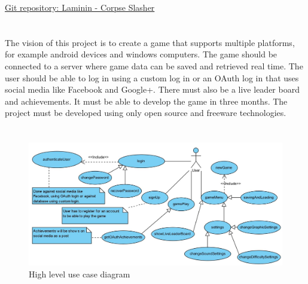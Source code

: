 \documentclass[letterpaper]{article}
\begin{document}
		\renewcommand{\cftdot}{}
		\hypersetup{linktocpage}
		\tableofcontents
		
		\begin{flushleft}
			\LARGE\href{https://github.com/njTaljaard/Laminin_CorpseSlasher/}{Git repository: Laminin - Corpse Slasher}
		\end{flushleft}
		
		\newpage
		
		\section*{\colorbox{blue}{}} 
		\vspace{0.2in}
		
		The vision of this project is to create a game that supports multiple platforms, for example android devices and windows computers. The game should be connected to a server where game data can be saved and retrieved real time. The user should be able to log in using a custom log in or an OAuth log in that uses social media like Facebook and Google+. There must also be a live leader board and achievements. It must be able to develop the game in three months. The project must be developed using only open source and freeware technologies.
					
		\section*{\colorbox{blue}{}} 
		
		\vspace{0.2in}
		
		\begin{figure}[ht!]
		\centering
		\includegraphics[width=180mm]{high_level_use_case_diagram}
		\caption{High level use case diagram}
		\label{overflow}
		\end{figure}
		
\end{document}
